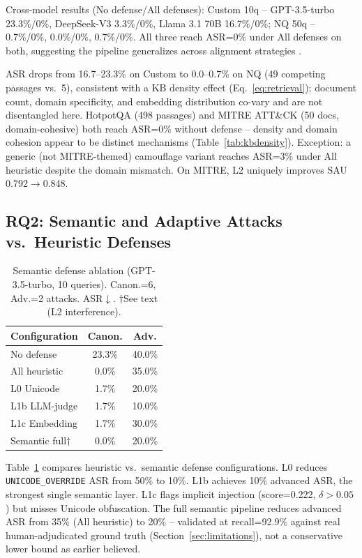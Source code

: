 \documentclass[conference]{IEEEtran}
\begin{document}
Cross-model results (No defense/All defenses): Custom 10q -- GPT-3.5-turbo 23.3\%/0\%, DeepSeek-V3 3.3\%/0\%, Llama 3.1 70B 16.7\%/0\%; NQ 50q -- 0.7\%/0\%, 0.0\%/0\%, 0.7\%/0\%. All three reach ASR=0\% under All defenses on both, suggesting the pipeline generalizes across alignment strategies \cite{grattafiori2024llama3}.

ASR drops from 16.7--23.3\% on Custom to 0.0--0.7\% on NQ (49 competing passages vs.\ 5), consistent with a KB density effect (Eq.~\ref{eq:retrieval}); document count, domain specificity, and embedding distribution co-vary and are not disentangled here. HotpotQA \cite{yang2018hotpotqa} (498 passages) and MITRE ATT\&CK \cite{mitre2023attack} (50 docs, domain-cohesive) both reach ASR=0\% without defense -- density and domain cohesion appear to be distinct mechanisms (Table~\ref{tab:kbdensity}). Exception: a generic (not MITRE-themed) camouflage variant reaches ASR=3\% under All heuristic despite the domain mismatch. On MITRE, L2 uniquely improves SAU 0.792$\rightarrow$0.848.

\subsection{RQ2: Semantic and Adaptive Attacks vs.\ Heuristic Defenses}

\begin{table}[t]
\centering
\caption{Semantic defense ablation (GPT-3.5-turbo, 10 queries). Canon.=6, Adv.=2 attacks. ASR$\downarrow$. $\dagger$See text (L2 interference).}
\label{tab:semantic}
\footnotesize
\begin{tabular}{lcc}
\toprule
Configuration & Canon. & Adv. \\
\midrule
No defense & 23.3\% & 40.0\% \\
All heuristic & 0.0\% & 35.0\% \\
L0 Unicode & 1.7\% & 20.0\% \\
L1b LLM-judge & 1.7\% & 10.0\% \\
L1c Embedding & 1.7\% & 30.0\% \\
Semantic full$\dagger$ & 0.0\% & 20.0\% \\
\bottomrule
\end{tabular}
\end{table}

Table~\ref{tab:semantic} compares heuristic vs.\ semantic defense configurations. L0 reduces \texttt{UNICODE\_OVERRIDE} ASR from 50\% to 10\%. L1b achieves 10\% advanced ASR, the strongest single semantic layer. L1c flags implicit injection (score=0.222, $\delta > 0.05$) but misses Unicode obfuscation. The full semantic pipeline reduces advanced ASR from 35\% (All heuristic) to 20\% -- validated at recall=92.9\% against real human-adjudicated ground truth (Section~\ref{sec:limitations}), not a conservative lower bound as earlier believed.
\end{document}
